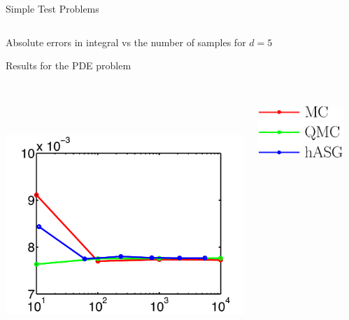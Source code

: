 \documentclass[final]{beamer}
\begin{document}
\begin{frame}{}
{\begin{columns}[t]
\begin{column}{.30\linewidth}
\begin{block}{\centering Simple Test Problems}
\begin{columns}[T]
\begin{column}{14cm}{}
\end{column}
\end{columns}
\vspace{0.5em}
\centering\scriptsize{Absolute errors in integral vs the number of samples for $d=5$}

\end{block}

                
\begin{block}{\centering Results for the PDE problem}
\vspace{-0.5em}
\begin{columns}[T]
\begin{column}{12cm}{}
\includegraphics[height=10cm, width = 14cm]{figures/exp5errors}\\
\end{column}
\begin{column}{4cm}{}
\vspace{2cm}
\centering\includegraphics[height=3cm,width=5cm]{figures/legend2}\\
\vspace{1em}
\end{column}
\begin{column}{14cm}{}

\end{column}
\end{columns}
\end{block}
\end{column}
\end{columns}}
\end{frame}
\end{document}
